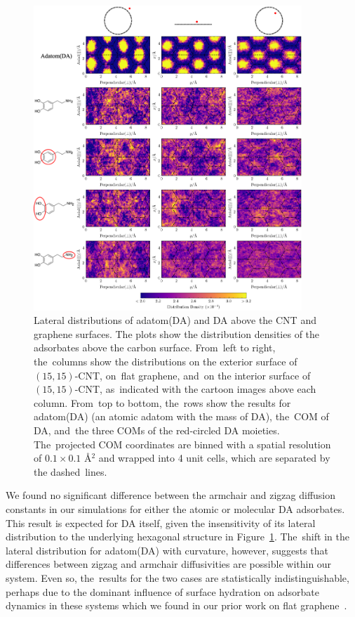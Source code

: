 \documentclass[molecules,article,accept,pdftex,moreauthors]{Definitions/mdpi}
\begin{document}
\begin{figure}[H]
    \includegraphics[width=0.9\textwidth]{Figures/moieties_com_distn/DA_lateral_moieties_distributions_full.png}
    \caption{Lateral distributions of adatom(DA) and DA above the CNT and graphene surfaces. The plots show the distribution densities of the adsorbates above the carbon surface. From~left to right, the~columns show the distributions on the exterior surface of $(15,15)$-CNT, on~flat graphene, and~on the interior surface of $(15,15)$-CNT, as~indicated with the cartoon images above each column. From~top to bottom, the~rows show the results for adatom(DA) (an atomic adatom with the mass of DA), the~COM of DA, and~the three COMs of the red-circled DA moieties. The~projected COM coordinates are binned with a spatial resolution of $0.1\times0.1$ \AA$^2$ and wrapped into 4 unit cells, which are separated by the dashed~lines.}
    \label{fig:Conf_lateral_DA}
\end{figure}





We found no significant difference between the armchair and zigzag diffusion constants in our simulations for either the atomic or molecular DA adsorbates. This result is expected for DA itself, given the insensitivity of its lateral distribution to the underlying hexagonal structure in  Figure~\ref{fig:Conf_lateral_DA}. The~shift in the lateral distribution for adatom(DA) with curvature, however, suggests that differences between zigzag and armchair diffusivities are possible within our system. Even so, the~results for the two cases are statistically indistinguishable, perhaps due to the dominant influence of surface hydration on adsorbate dynamics in these systems which we found in our prior work on flat graphene~\cite{Jia2022}. 
\end{document}
